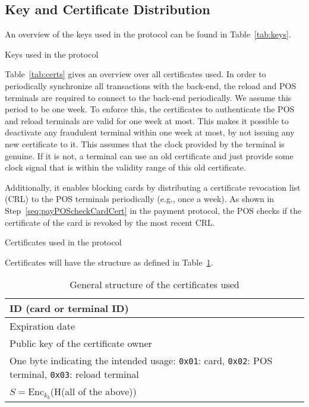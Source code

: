 \subsection{Key and Certificate Distribution}

An overview of the keys used in the protocol can be found in Table~\ref{tab:keys}.
\begin{table}[h]
    \centering
    
    \caption{Keys used in the protocol}
    \label{tab:keys}
\end{table}

Table~\ref{tab:certs} gives an overview over all certificates used.
In order to periodically synchronize all transactions with the back-end, the reload and POS terminals are required to connect to the back-end periodically.
We assume this period to be one week.
To enforce this, the certificates to authenticate the POS and reload terminals are valid for one week at most.
This makes it possible to deactivate any fraudulent terminal within one week at most, by not issuing any new certificate to it.
This assumes that the clock provided by the terminal is genuine.
If it is not, a terminal can use an old certificate and just provide some clock signal that is within the validity range of this old certificate.

Additionally, it enables blocking cards by distributing a certificate revocation list (CRL) to the POS terminals periodically (e.g., once a week).
As shown in Step~\ref{seq:payPOScheckCardCert} in the payment protocol, the POS checks if the certificate of the card is revoked by the most recent CRL\@.

\begin{table}[h]
    \centering
    
    \caption{Certificates used in the protocol}
    \label{tab:certs}
\end{table}

Certificates will have the structure as defined in Table~\ref{tab:certStructure}.
\begin{table}[h]
    \centering
    \begin{tabular}{|p{8cm}|}
    \hline
        ID (card or terminal ID) \\
    \hline
        Expiration date \\
    \hline
        Public key of the certificate owner \\
    \hline
        One byte indicating the intended usage: \texttt{0x01}: card, \texttt{0x02}: POS terminal, \texttt{0x03}: reload terminal \\
    \hline
        $S = \textrm{Enc}_{k_b}$(H(all of the above)) \\
    \hline
    \end{tabular}
    \caption{General structure of the certificates used}
    \label{tab:certStructure}
\end{table}

